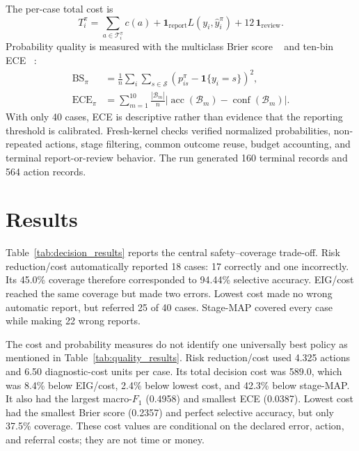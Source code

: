 \documentclass{article}
\begin{document}
The per-case total cost is
\begin{equation}
T_i^\pi=
\sum_{a\in\mathcal T_i^\pi}c(a)
+\mathbf1_{\mathrm{report}}L(y_i,\widehat y_i^\pi)
+12\,\mathbf1_{\mathrm{review}}.
\label{eq:test_total_cost}
\end{equation}
Probability quality is measured with the multiclass Brier score
~\cite{Brier1950Verification} and ten-bin ECE
~\cite{Guo2017Calibration}:
\begin{align}
\operatorname{BS}_\pi
  &=\frac{1}{n}\sum_i\sum_{s\in\mathcal S}
    \left(p_{is}^\pi-\mathbf1\{y_i=s\}\right)^2,
  \label{eq:brier}\\
\operatorname{ECE}_\pi
  &=\sum_{m=1}^{10}\frac{|\mathcal B_m|}{n}
    \left|\operatorname{acc}(\mathcal B_m)
    -\operatorname{conf}(\mathcal B_m)\right|.
  \label{eq:ece}
\end{align}
With only 40 cases, ECE is descriptive rather than evidence that the reporting
threshold is calibrated. Fresh-kernel checks verified normalized
probabilities, non-repeated actions, stage filtering, common outcome reuse,
budget accounting, and terminal report-or-review behavior. The run generated
160 terminal records and 564 action records.

\section{Results}
\label{sec:results}

Table~\ref{tab:decision_results} reports the central safety--coverage trade-off.
Risk reduction/cost automatically reported 18 cases: 17 correctly and one
incorrectly. Its 45.0\% coverage therefore corresponded to 94.44\% selective
accuracy. EIG/cost reached the same coverage but made two errors. Lowest cost
made no wrong automatic report, but referred 25 of 40 cases. Stage-MAP covered
every case while making 22 wrong reports.



The cost and probability measures do not identify one universally best policy as mentioned in Table~\ref{tab:quality_results}. Risk reduction/cost used 4.325 actions and
6.50 diagnostic-cost units per case. Its total decision cost was 589.0, which
was 8.4\% below EIG/cost, 2.4\% below lowest cost, and 42.3\% below stage-MAP.
It also had the largest macro-$F_1$ (0.4958) and smallest ECE (0.0387).
Lowest cost had the smallest Brier score (0.2357) and perfect selective
accuracy, but only 37.5\% coverage. These cost values are conditional on the
declared error, action, and referral costs; they are not time or money.
\end{document}
